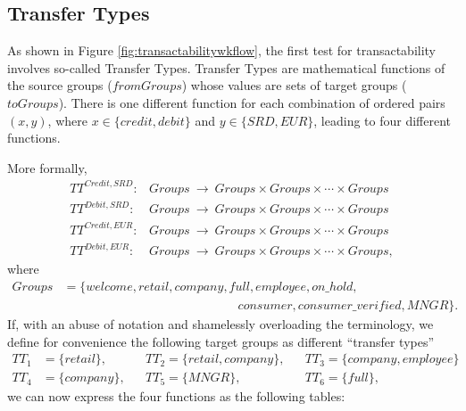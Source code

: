 \subsection{Transfer Types}
As shown in Figure \ref{fig:transactabilitywkflow}, the first test for transactability involves so-called Transfer Types. Transfer Types are mathematical functions of the source groups ($fromGroups$) whose values are sets of target groups ($toGroups$). There is one different function for each combination of ordered pairs $(x, y)$, where $x \in \{ credit, debit \}$ and $y \in \{ SRD, EUR \}$, leading to four different functions.

More formally,
\begin{align}
TT^{Credit,SRD}\colon &Groups\ \rightarrow\ Groups \times Groups \times \cdots \times Groups \\
TT^{Debit,SRD}\colon &Groups\ \rightarrow\ Groups \times Groups \times \cdots \times Groups \\
TT^{Credit,EUR}\colon &Groups\ \rightarrow\ Groups \times Groups \times \cdots \times Groups \\
TT^{Debit,EUR}\colon &Groups\ \rightarrow\ Groups \times Groups \times \cdots \times Groups,
\end{align}
where
\begin{align}
Groups &= \{ welcome, retail, company, full, employee, on\text{\_}hold,  \nonumber \\
		& \qquad\qquad\qquad\qquad\qquad\qquad\qquad
			consumer, consumer\text{\_}verified, MNGR \}.
\end{align}
If, with an abuse of notation and shamelessly overloading the terminology, we define for convenience the following target groups as different ``transfer types''
\begin{align*}
TT_1 &= \{ retail \},		&& TT_2 = \{ retail, company \},		&& TT_3 = \{ company, employee \} \\
TT_4 &= \{ company \},	&& TT_5 = \{ MNGR \},			&& TT_6 = \{ full \},
\end{align*}
we can now express the four functions as the following tables:

